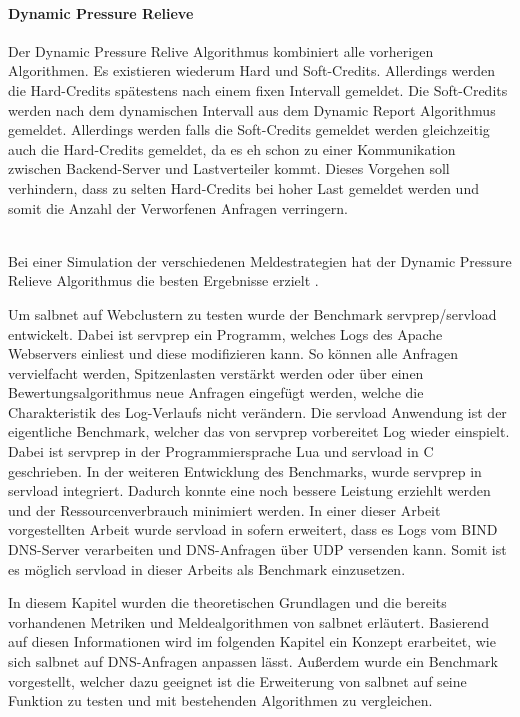 \documentclass[a4paper, 12pt, BCOR10mm, DIV12, toc=bibliography, toc=listof, german]{scrbook}
\begin{document}

	\paragraph{Dynamic Pressure Relieve} %
	\label{par:dynamic-pressure-relieve}
	
	Der Dynamic Pressure Relive Algorithmus kombiniert alle vorherigen Algorithmen. Es existieren
	wiederum Hard und Soft-Credits. Allerdings werden die Hard-Credits spätestens nach einem fixen
	Intervall gemeldet. Die Soft-Credits werden nach dem dynamischen Intervall aus dem Dynamic Report
	Algorithmus gemeldet. Allerdings werden falls die Soft-Credits gemeldet werden gleichzeitig auch
	die Hard-Credits gemeldet, da es eh schon zu einer Kommunikation zwischen Backend-Server und
	Lastverteiler kommt. Dieses Vorgehen soll verhindern, dass zu selten Hard-Credits bei hoher Last
	gemeldet werden und somit die Anzahl der Verworfenen Anfragen verringern.

$~$\\

	Bei einer Simulation der verschiedenen Meldestrategien hat der Dynamic Pressure Relieve
	Algorithmus die besten Ergebnisse erzielt \cite{scsczile2008}.

	Um salbnet auf Webclustern zu testen wurde der Benchmark servprep/servload \cite{habenschuss2011}
	entwickelt. Dabei ist servprep ein Programm, welches Logs des Apache Webservers einliest und
	diese modifizieren kann. So können alle Anfragen vervielfacht werden, Spitzenlasten verstärkt
	werden oder über einen Bewertungsalgorithmus neue Anfragen eingefügt werden, welche die
	Charakteristik des Log-Verlaufs nicht verändern. Die servload Anwendung ist der eigentliche
	Benchmark, welcher das von servprep vorbereitet Log wieder einspielt. Dabei ist servprep in der
	Programmiersprache Lua und servload in C geschrieben. In der weiteren Entwicklung des Benchmarks,
	wurde servprep in servload integriert. Dadurch konnte eine noch bessere Leistung erziehlt werden
	und der Ressourcenverbrauch minimiert werden. In einer dieser Arbeit vorgestellten Arbeit
	\cite{menski2012} wurde servload in sofern erweitert, dass es Logs vom BIND DNS-Server verarbeiten
	und DNS-Anfragen über UDP versenden kann. Somit ist es möglich servload in dieser Arbeits als
	Benchmark einzusetzen.

	In diesem Kapitel wurden die theoretischen Grundlagen und die bereits vorhandenen Metriken und
	Meldealgorithmen von salbnet erläutert. Basierend auf diesen Informationen wird im folgenden
	Kapitel ein Konzept erarbeitet, wie sich salbnet auf DNS-Anfragen anpassen lässt. Außerdem wurde
	ein Benchmark vorgestellt, welcher dazu geeignet ist die Erweiterung von salbnet auf seine
	Funktion zu testen und mit bestehenden Algorithmen zu vergleichen. 
\end{document}

